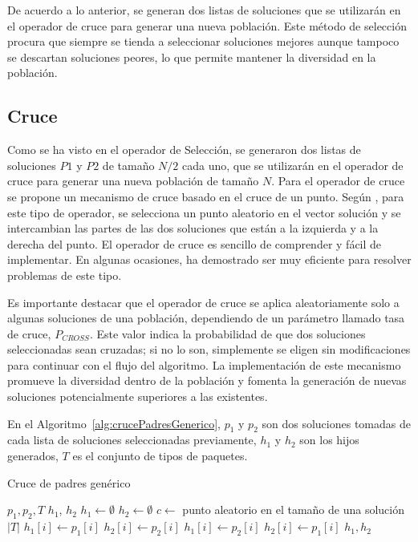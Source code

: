 \documentclass[openany]{article}
\begin{document}
De acuerdo a lo anterior, se generan dos listas de soluciones que se utilizarán en el operador de cruce para generar una nueva población. Este método de selección procura que siempre se tienda a seleccionar soluciones mejores aunque tampoco se descartan soluciones peores, lo que permite mantener la diversidad en la población.

\subsection{Cruce}

Como se ha visto en el operador de Selección, se generaron dos listas de soluciones $P1$ y $P2$ de tamaño $N/2$ cada uno, que se utilizarán en el operador de cruce para generar una nueva población de tamaño $N$. Para el operador de cruce se propone un mecanismo de cruce basado en el cruce de un punto. Según \textcite{Umbarkar2015}, para este tipo de operador, se selecciona un punto aleatorio en el vector solución y se intercambian las partes de las dos soluciones que están a la izquierda y a la derecha del punto. El operador de cruce es sencillo de comprender y fácil de implementar. En algunas ocasiones, ha demostrado ser muy eficiente para resolver problemas de este tipo.

Es importante destacar que el operador de cruce se aplica aleatoriamente solo a algunas soluciones de una población, dependiendo de un parámetro llamado tasa de cruce, \(P_{CROSS}\). Este valor indica la probabilidad de que dos soluciones seleccionadas sean cruzadas; si no lo son, simplemente se eligen sin modificaciones para continuar con el flujo del algoritmo. La implementación de este mecanismo promueve la diversidad dentro de la población y fomenta la generación de nuevas soluciones potencialmente superiores a las existentes.

En el Algoritmo~\ref{alg:crucePadresGenerico}, $p_1$ y $p_2$ son dos soluciones tomadas de cada lista de soluciones seleccionadas previamente, $h_1$ y $h_2$ son los hijos generados, $T$ es el conjunto de tipos de paquetes.

\begin{algorithm}[H]
    \caption{Cruce de padres genérico}\label{alg:crucePadresGenerico}
    \begin{algorithmic}[1]
        \Require $p_1, p_2, T$
        \Ensure $h_1$, $h_2$
        \State $h_1 \leftarrow \emptyset$
        \State $h_2 \leftarrow \emptyset$
        \State $c \leftarrow$ punto aleatorio en el tamaño de una solución $|T|$
        \State $h_1[i] \leftarrow p_1[i]$
        \State $h_2[i] \leftarrow p_2[i]$
        \Else
        \State $h_1[i] \leftarrow p_2[i]$
        \State $h_2[i] \leftarrow p_1[i]$
        \EndIf
        \EndFor
        \State \Return $h_1, h_2$
    \end{algorithmic}
\end{algorithm}
\end{document}
